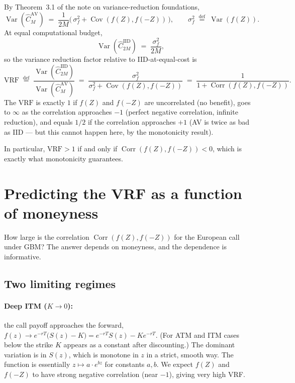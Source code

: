 \documentclass[11pt,a4paper]{article}
\theoremstyle{plain}
\theoremstyle{definition}
\theoremstyle{remark}
\newcommand{\Var}{\operatorname{Var}}
\newcommand{\Cov}{\operatorname{Cov}}
\newcommand{\Corr}{\operatorname{Corr}}
\newcommand{\eqdef}{\overset{\mathrm{def}}{=}}
\begin{document}
By Theorem~3.1 of the note on variance-reduction foundations,
\begin{equation}
\label{eq:av-variance-call}
\Var(\hat C_M^{\mathrm{AV}}) \;=\; \frac{1}{2M}\bigl(\, \sigma^2_f + \Cov(f(Z), f(-Z)) \,\bigr),
\qquad \sigma^2_f \;\eqdef\; \Var(f(Z)).
\end{equation}
At equal computational budget,
\begin{equation}
\Var(\hat C_{2M}^{\mathrm{IID}}) \;=\; \frac{\sigma^2_f}{2M},
\end{equation}
so the variance reduction factor relative to IID-at-equal-cost is
\begin{equation}
\label{eq:vrf}
\mathrm{VRF} \;\eqdef\;
\frac{\Var(\hat C_{2M}^{\mathrm{IID}})}{\Var(\hat C_M^{\mathrm{AV}})}
\;=\; \frac{\sigma^2_f}{\sigma^2_f + \Cov(f(Z), f(-Z))}
\;=\; \frac{1}{1 + \Corr(f(Z), f(-Z))}.
\end{equation}
The $\mathrm{VRF}$ is exactly $1$ if $f(Z)$ and $f(-Z)$ are
uncorrelated (no benefit), goes to $\infty$ as the correlation
approaches $-1$ (perfect negative correlation, infinite reduction),
and equals $1/2$ if the correlation approaches $+1$ (AV is twice as
bad as IID --- but this cannot happen here, by the monotonicity
result).

In particular, $\mathrm{VRF} > 1$ if and only if
$\Corr(f(Z), f(-Z)) < 0$, which is exactly what monotonicity
guarantees.

\section{Predicting the VRF as a function of moneyness}
\label{sec:vrf-prediction}

How large is the correlation $\Corr(f(Z), f(-Z))$ for the European
call under GBM? The answer depends on moneyness, and the dependence
is informative.

\subsection{Two limiting regimes}

\paragraph{Deep ITM ($K \to 0$):} the call payoff approaches the
forward, $f(z) \to e^{-rT} \bigl(S(z) - K\bigr) = e^{-rT}
S(z) - K e^{-rT}$. (For ATM and ITM cases below the strike $K$
appears as a constant after discounting.) The dominant variation is
in $S(z)$, which is monotone in $z$ in a strict, smooth way. The
function is essentially $z \mapsto a \cdot e^{bz}$ for constants
$a, b$. We expect $f(Z)$ and $f(-Z)$ to have strong negative
correlation (near $-1$), giving very high VRF.
\end{document}
